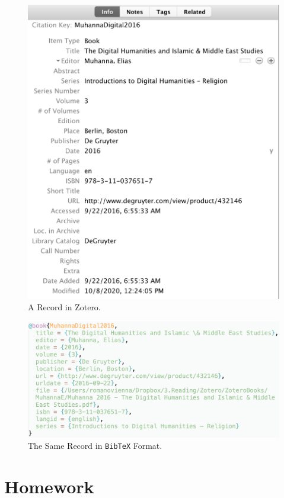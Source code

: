 \documentclass[
]{book}
\begin{document}
\begin{figure}
\centering
\includegraphics{./images/rec_zotero.png}
\caption{A Record in Zotero.}
\end{figure}

\begin{figure}
\centering
\includegraphics{./images/rec_bibtex.png}
\caption{The Same Record in \texttt{BibTeX} Format.}
\end{figure}

\hypertarget{homework}{%
\section{Homework}\label{homework}}
\end{document}
